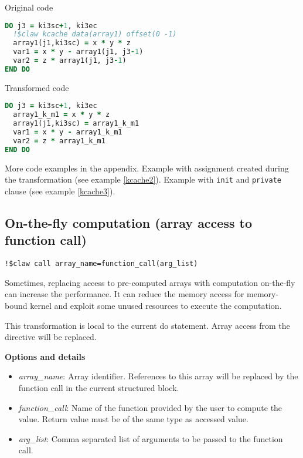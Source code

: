 Original code
\begin{lstlisting}[language=Fortran]
DO j3 = ki3sc+1, ki3ec
  !$claw kcache data(array1) offset(0 -1)
  array1(j1,ki3sc) = x * y * z
  var1 = x * y - array1(j1, j3-1)
  var2 = z * array1(j1, j3-1)
END DO
\end{lstlisting}


Transformed code
\begin{lstlisting}[language=Fortran]
DO j3 = ki3sc+1, ki3ec
  array1_k_m1 = x * y * z
  array1(j1,ki3sc) = array1_k_m1
  var1 = x * y - array1_k_m1
  var2 = z * array1_k_m1
END DO
\end{lstlisting}

More code examples in the appendix. Example with assignment created during the transformation (see example \ref{kcache2}). Example with \lstinline!init! and \lstinline!private! clause (see example \ref{kcache3}). 

\subsection{On-the-fly computation (array access to function call)}
\begin{lstlisting}
!$claw call array_name=function_call(arg_list)
\end{lstlisting}

Sometimes, replacing access to pre-computed arrays with computation on-the-fly
can increase the performance. It can reduce the memory access for memory-bound
kernel and exploit some unused resources to execute the computation.

This transformation is local to the current do statement. Array access from the directive will be replaced. 

\textbf{Options and details}
\begin{itemize}
\item \textit{array\_name}: Array identifier. References to this array will be replaced by the function call in the current structured block. 
\item \textit{function\_call}: Name of the function provided by the user to compute the value. Return value must be of the same type as accessed value. 
\item \textit{arg\_list}: Comma separated list of arguments to be passed to the function call. 
\end{itemize}
